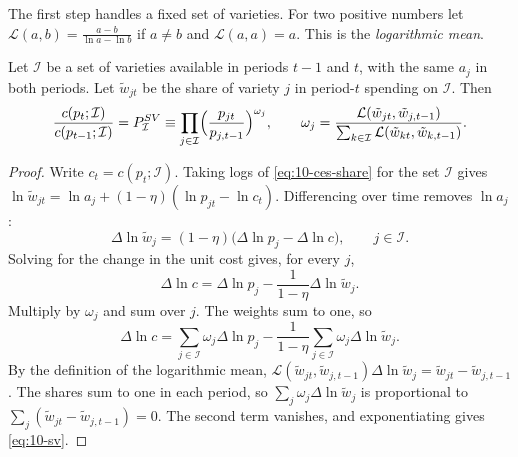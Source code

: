 The first step handles a fixed set of varieties. For two positive numbers let
$\mathcal{L}(a,b) = \frac{a - b}{\ln a - \ln b}$ if $a \neq b$ and $\mathcal{L}(a,a) = a$. This is the
\emph{logarithmic mean}.

\begin{lemma}\label{lem:10-sato-vartia}
Let $\mathcal{I}$ be a set of varieties available in periods $t-1$ and $t$, with the same $a_j$ in both
periods. Let $\tilde w_{jt}$ be the share of variety $j$ in period-$t$ spending on $\mathcal{I}$. Then
\begin{equation}\label{eq:10-sv}
  \frac{c(p_t;\mathcal{I})}{c(p_{t-1};\mathcal{I})} = P^{SV}_{\mathcal{I}}
  \equiv \prod_{j\in\mathcal{I}}\Bigl(\frac{p_{jt}}{p_{j,t-1}}\Bigr)^{\omega_j}, \qquad
  \omega_j = \frac{\mathcal{L}(\tilde w_{jt},\tilde w_{j,t-1})}{\sum_{k\in\mathcal{I}}\mathcal{L}(\tilde w_{kt},\tilde w_{k,t-1})}.
\end{equation}
\end{lemma}

\begin{proof}
Write $c_t = c(p_t;\mathcal{I})$. Taking logs of \eqref{eq:10-ces-share} for the set $\mathcal{I}$ gives
$\ln\tilde w_{jt} = \ln a_j + (1-\eta)(\ln p_{jt} - \ln c_t)$. Differencing over time removes $\ln a_j$:
\begin{equation*}
  \Delta\ln\tilde w_j = (1-\eta)\bigl(\Delta\ln p_j - \Delta\ln c\bigr), \qquad j \in \mathcal{I}.
\end{equation*}
Solving for the change in the unit cost gives, for every $j$,
\begin{equation*}
  \Delta\ln c = \Delta\ln p_j - \frac{1}{1-\eta}\Delta\ln\tilde w_j .
\end{equation*}
Multiply by $\omega_j$ and sum over $j$. The weights sum to one, so
\begin{equation*}
  \Delta\ln c = \sum_{j\in\mathcal{I}}\omega_j\Delta\ln p_j - \frac{1}{1-\eta}\sum_{j\in\mathcal{I}}\omega_j\Delta\ln\tilde w_j .
\end{equation*}
By the definition of the logarithmic mean, $\mathcal{L}(\tilde w_{jt},\tilde w_{j,t-1})\Delta\ln\tilde w_j =
\tilde w_{jt} - \tilde w_{j,t-1}$. The shares sum to one in each period, so
$\sum_j\omega_j\Delta\ln\tilde w_j$ is proportional to $\sum_j(\tilde w_{jt} - \tilde w_{j,t-1}) = 0$. The
second term vanishes, and exponentiating gives \eqref{eq:10-sv}.
\end{proof}

